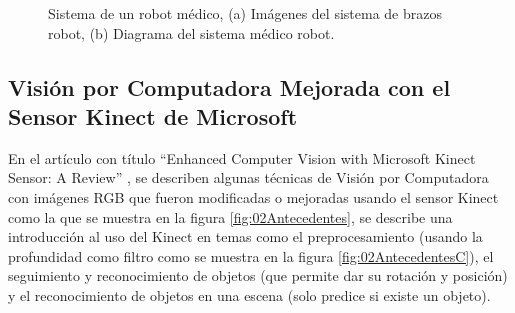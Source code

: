         \begin{figure}[!htb]
        	\centering
        	\caption[Sistema de un robot médico.]{Sistema de un robot médico, (a)  Imágenes del sistema de brazos robot, (b) Diagrama del sistema médico robot. 
        	\label{fig:04Antecedentes}}
        \end{figure}
    
    
    \subsection{Visión por Computadora Mejorada con el Sensor Kinect de Microsoft }
    
        En el artículo con título “Enhanced Computer Vision with Microsoft Kinect Sensor: A Review” \cite{CompVisionKinect}, se describen algunas técnicas de Visión por Computadora con imágenes RGB que fueron modificadas o mejoradas usando el sensor Kinect como la que se muestra en la figura \ref{fig:02Antecedentes}, se describe una introducción al uso del Kinect en temas como el preprocesamiento (usando la profundidad como filtro como se muestra en la figura \ref{fig:02AntecedentesC}), el seguimiento y reconocimiento de objetos (que permite dar su rotación y posición) y el reconocimiento de objetos en una escena (solo predice si existe un objeto).\\
        
